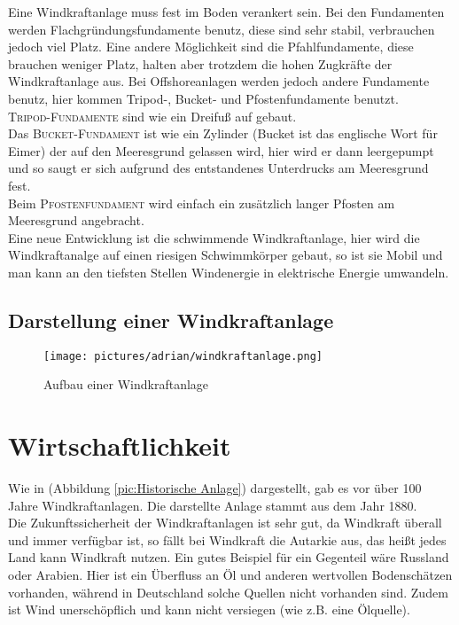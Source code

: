 \documentclass[12pt]{scrbook}
\begin{document}
Eine Windkraftanlage muss fest im Boden verankert sein. Bei den Fundamenten
werden Flachgründungsfundamente benutz, diese sind sehr stabil, verbrauchen
jedoch viel Platz. Eine andere Möglichkeit sind die Pfahlfundamente, diese
brauchen weniger Platz, halten aber trotzdem die hohen Zugkräfte der
Windkraftanlage aus. Bei Offshoreanlagen werden jedoch andere Fundamente
benutz, hier kommen Tripod-, Bucket- und Pfostenfundamente benutzt.\\
\textsc{Tripod-Fundamente} sind wie ein Dreifuß auf gebaut. \\
Das \textsc{Bucket-Fundament} ist wie ein Zylinder (Bucket ist das englische Wort für Eimer) der auf den
Meeresgrund gelassen wird, hier wird er dann leergepumpt und so saugt er sich
aufgrund des entstandenes Unterdrucks am Meeresgrund fest. \\
Beim \textsc{Pfostenfundament} wird einfach ein zusätzlich langer Pfosten am Meeresgrund
angebracht. \\
Eine neue Entwicklung ist die schwimmende Windkraftanlage, hier
wird die Windkraftanalge auf einen riesigen Schwimmkörper gebaut, so ist sie
Mobil und man kann an den tiefsten Stellen Windenergie in elektrische Energie
umwandeln.



\newpage

\subsection{Darstellung einer Windkraftanlage}


\begin{figure}[htbp] 
  \centering
     \texttt{[image: pictures/adrian/windkraftanlage.png]}
  \caption{Aufbau einer Windkraftanlage}
  \label{pic:Windkraftanlage}
\end{figure}




\newpage


\section{Wirtschaftlichkeit}

Wie in (Abbildung \ref{pic:Historische Anlage}) dargestellt, gab es vor über 100 
Jahre Windkraftanlagen. Die darstellte Anlage stammt aus dem Jahr 1880.\\
Die Zukunftssicherheit der Windkraftanlagen ist sehr gut, da Windkraft überall
und immer verfügbar ist, so fällt bei Windkraft die Autarkie aus, das heißt
jedes Land kann Windkraft nutzen. Ein gutes Beispiel für ein Gegenteil wäre
Russland oder Arabien. Hier ist ein Überfluss an Öl und anderen wertvollen
Bodenschätzen vorhanden, während in Deutschland solche Quellen nicht vorhanden
sind. Zudem ist Wind unerschöpflich und kann nicht versiegen (wie z.B. eine
Ölquelle). 
\end{document}
